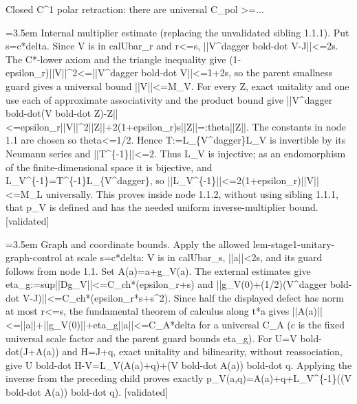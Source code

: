 \documentclass{article}
\newcommand{\step}[1]{\par\noindent\hangindent=3.5em\hangafter=1%
  \makebox[3.5em][l]{\textbf{#1.}}}
\newcommand{\steptag}[1]{\hfill{\small\textsf{[#1]}}}
\begin{document}
\begin{proofbox}{Closed C\textasciicircum{}1 polar retraction: there are universal C\_pol >=...}
\step{1.1.2.1} Internal multiplier estimate (replacing the unvalidated sibling 1.1.1). Put s=c*delta. Since V is in calUbar\_r and r<=s, ||V\textasciicircum{}dagger bold-dot V-J||<=2s. The C*-lower axiom and the triangle inequality give (1-epsilon\_r)||V||\textasciicircum{}2<=||V\textasciicircum{}dagger bold-dot V||<=1+2s, so the parent smallness guard gives a universal bound ||V||<=M\_V. For every Z, exact unitality and one use each of approximate associativity and the product bound give ||V\textasciicircum{}dagger bold-dot(V bold-dot Z)-Z||<=epsilon\_r||V||\textasciicircum{}2||Z||+2(1+epsilon\_r)s||Z||=:theta||Z||. The constants in node 1.1 are chosen so theta<=1/2. Hence T:=L\_\{V\textasciicircum{}dagger\}L\_V is invertible by its Neumann series and ||T\textasciicircum{}\{-1\}||<=2. Thus L\_V is injective; as an endomorphism of the finite-dimensional space it is bijective, and L\_V\textasciicircum{}\{-1\}=T\textasciicircum{}\{-1\}L\_\{V\textasciicircum{}dagger\}, so ||L\_V\textasciicircum{}\{-1\}||<=2(1+epsilon\_r)||V||<=M\_L universally. This proves inside node 1.1.2, without using sibling 1.1.1, that p\_V is defined and has the needed uniform inverse-multiplier bound. \steptag{validated} \\[4pt]
\step{1.1.2.2} Graph and coordinate bounds. Apply the allowed lem-stage1-unitary-graph-control at scale s=c*delta: V is in calUbar\_s, ||a||<2s, and its guard follows from node 1.1. Set A(a)=a+g\_V(a). The external estimates give eta\_g:=sup||Dg\_V||<=C\_ch*(epsilon\_r+s) and ||g\_V(0)+(1/2)(V\textasciicircum{}dagger bold-dot V-J)||<=C\_ch*(epsilon\_r*s+s\textasciicircum{}2). Since half the displayed defect has norm at most r<=s, the fundamental theorem of calculus along t*a gives ||A(a)||<=||a||+||g\_V(0)||+eta\_g||a||<=C\_A*delta for a universal C\_A (c is the fixed universal scale factor and the parent guard bounds eta\_g). For U=V bold-dot(J+A(a)) and H=J+q, exact unitality and bilinearity, without reassociation, give U bold-dot H-V=L\_V(A(a)+q)+(V bold-dot A(a)) bold-dot q. Applying the inverse from the preceding child proves exactly p\_V(a,q)=A(a)+q+L\_V\textasciicircum{}\{-1\}((V bold-dot A(a)) bold-dot q). \steptag{validated} \\[4pt]

\end{proofbox}
\end{document}
